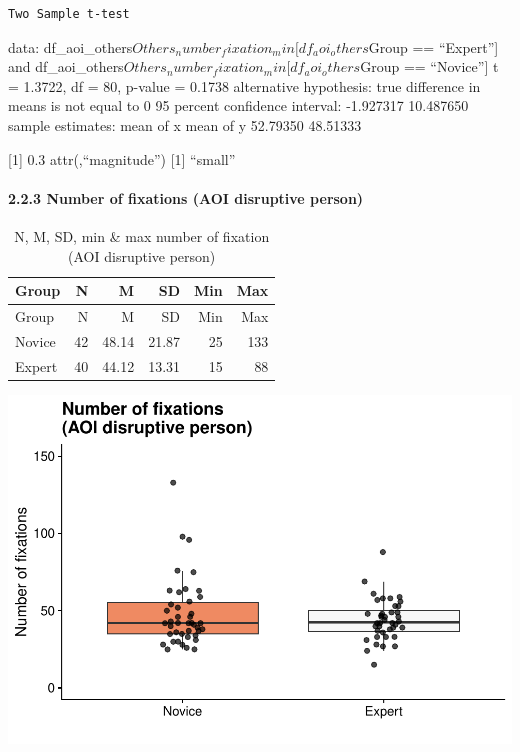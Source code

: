 \documentclass[
]{article}
\begin{document}
\begin{verbatim}
Two Sample t-test
\end{verbatim}

data: df\_aoi\_others\(Others_number_fixation_min[df_aoi_others\)Group
== ``Expert''{]} and
df\_aoi\_others\(Others_number_fixation_min[df_aoi_others\)Group ==
``Novice''{]} t = 1.3722, df = 80, p-value = 0.1738 alternative
hypothesis: true difference in means is not equal to 0 95 percent
confidence interval: -1.927317 10.487650 sample estimates: mean of x
mean of y 52.79350 48.51333

{[}1{]} 0.3 attr(,``magnitude'') {[}1{]} ``small''

\paragraph{2.2.3 Number of fixations (AOI disruptive
person)}\label{number-of-fixations-aoi-disruptive-person}

\begin{longtable}[]{@{}lrrrrr@{}}
\caption{N, M, SD, min \& max number of fixation (AOI disruptive
person)}\tabularnewline
\toprule\noalign{}
Group & N & M & SD & Min & Max \\
\midrule\noalign{}
\endfirsthead
\toprule\noalign{}
Group & N & M & SD & Min & Max \\
\midrule\noalign{}
\endhead
\bottomrule\noalign{}
\endlastfoot
Novice & 42 & 48.14 & 21.87 & 25 & 133 \\
Expert & 40 & 44.12 & 13.31 & 15 & 88 \\
\end{longtable}

\includegraphics{expertise_2024_09_26_no_outlierdetection_MK_files/figure-latex/nof_disrup-1.pdf}
\end{document}
